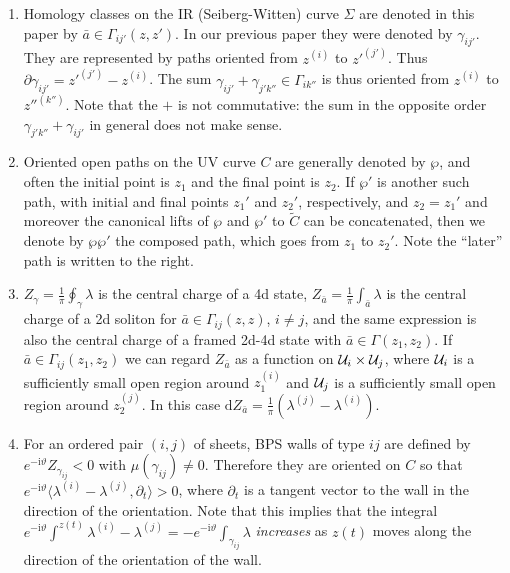 \documentclass[11pt,a4paper]{article}
\def\CU{{\cal U}}
\def\p{\partial}
\def\p{\partial}
\def\CU{{\cal U}}
\newcommand\I{{\mathrm i}}
\newcommand\de{{\mathrm{d}}}
\begin{document}
\begin{enumerate}

\item Homology classes on the IR (Seiberg-Witten)
curve $\Sigma$ are denoted in this paper by $\bar a \in \Gamma_{ij'}(z,z')$.
In our previous paper \cite{Gaiotto:2011tf} they were denoted by $\gamma_{ij'}$.
They are represented by paths oriented from $z^{(i)}$ to ${z'}^{(j')}$.
Thus $\p \gamma_{ij'} = {z'}^{(j')} - z^{(i)}$.
The sum $\gamma_{ij'} + \gamma_{j'k''} \in \Gamma_{ik''}$ is thus
oriented from $z^{(i)}$ to ${z''}^{(k'')}$. Note that the $+$
is not commutative:  the sum in the opposite order
$\gamma_{j'k''}+\gamma_{ij'}$ in general does not make sense.

\item Oriented open paths on the UV curve $C$ are generally
denoted by $\wp$, and often the
initial point is $z_1$ and the final point is $z_2$.
If $\wp' $ is another such path, with initial
and final points $z_1'$ and $z_2'$, respectively,
and $z_2=z_1'$ and moreover the canonical lifts of
$\wp $ and $\wp'$ to $\tilde C$ can be concatenated,
then we denote by $\wp\wp'$ the composed path, which goes from $z_1$ to $z_2'$.
Note the ``later'' path is written to the right.

\item $Z_{\gamma} = \frac{1}{\pi} \oint_{\gamma} \lambda$ is the central charge of a 4d state,
$Z_{\bar a} = \frac{1}{\pi} \int_{\bar a} \lambda$ is the central charge of a 2d soliton
for $\bar a \in \Gamma_{ij}(z,z)$, $i\not=j$, and the same expression is
also the central charge of a framed 2d-4d state with $\bar a \in \Gamma(z_1,z_2)$.
If $\bar a \in \Gamma_{ij}(z_1,z_2)$ we can regard $Z_{\bar a}$ as a function
 on $\CU_{i} \times \CU_{j}$, where
$\CU_i$ is a sufficiently small open region around $z_1^{(i)}$ and
$\CU_{j}$ is a sufficiently small open region around $z_2^{(j)}$.
In this case  $\de Z_{\bar a} = \frac{1}{\pi} ( \lambda^{(j)} - \lambda^{(i)})$.

\item For an ordered pair $(i,j)$ of sheets,
BPS walls of type $ij$ are defined by $e^{-\I \vartheta} Z_{\gamma_{ij}} <0$ with $\mu(\gamma_{ij})\not=0$.
Therefore they are oriented on $C$ so that $e^{-\I \vartheta} \langle \lambda^{(i)} - \lambda^{(j)}, \p_t \rangle > 0$,
where $\p_t$ is a tangent vector to the wall in the direction of the orientation.
Note that this implies that the integral  $e^{-\I \vartheta}\int^{z(t)}   \lambda^{(i)} - \lambda^{(j)}
= - e^{-\I \vartheta} \int_{\gamma_{ij}} \lambda$
\emph{increases} as $z(t)$ moves
along the direction of the orientation of the wall.


\end{enumerate}
\end{document}
